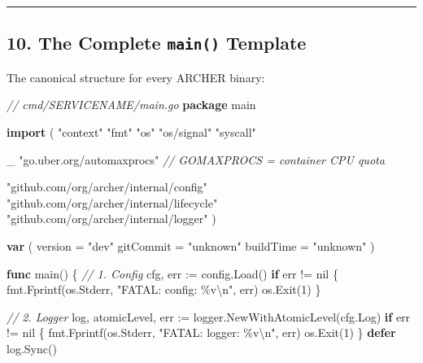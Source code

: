 \documentclass[
]{article}
\newenvironment{Shaded}{}{}
\newcommand{\CharTok}[1]{\textcolor[rgb]{0.25,0.44,0.63}{#1}}
\newcommand{\CommentTok}[1]{\textcolor[rgb]{0.38,0.63,0.69}{\textit{#1}}}
\newcommand{\ControlFlowTok}[1]{\textcolor[rgb]{0.00,0.44,0.13}{\textbf{#1}}}
\newcommand{\DecValTok}[1]{\textcolor[rgb]{0.25,0.63,0.44}{#1}}
\newcommand{\KeywordTok}[1]{\textcolor[rgb]{0.00,0.44,0.13}{\textbf{#1}}}
\newcommand{\NormalTok}[1]{#1}
\newcommand{\OperatorTok}[1]{\textcolor[rgb]{0.40,0.40,0.40}{#1}}
\newcommand{\OtherTok}[1]{\textcolor[rgb]{0.00,0.44,0.13}{#1}}
\newcommand{\StringTok}[1]{\textcolor[rgb]{0.25,0.44,0.63}{#1}}
\begin{document}
\begin{center}\rule{0.5\linewidth}{0.5pt}\end{center}

\hypertarget{the-complete-main-template}{%
\subsection{\texorpdfstring{10. The Complete \texttt{main()}
Template}{10. The Complete main() Template}}\label{the-complete-main-template}}

The canonical structure for every ARCHER binary:

\begin{Shaded}
\begin{Highlighting}[]
\CommentTok{// cmd/SERVICENAME/main.go}
\KeywordTok{package}\NormalTok{ main}

\KeywordTok{import} \OperatorTok{(}
    \StringTok{"context"}
    \StringTok{"fmt"}
    \StringTok{"os"}
    \StringTok{"os/signal"}
    \StringTok{"syscall"}

\NormalTok{    \_ }\StringTok{"go.uber.org/automaxprocs"} \CommentTok{// GOMAXPROCS = container CPU quota}

    \StringTok{"github.com/org/archer/internal/config"}
    \StringTok{"github.com/org/archer/internal/lifecycle"}
    \StringTok{"github.com/org/archer/internal/logger"}
\OperatorTok{)}

\KeywordTok{var} \OperatorTok{(}
\NormalTok{    version   }\OperatorTok{=} \StringTok{"dev"}
\NormalTok{    gitCommit }\OperatorTok{=} \StringTok{"unknown"}
\NormalTok{    buildTime }\OperatorTok{=} \StringTok{"unknown"}
\OperatorTok{)}

\KeywordTok{func}\NormalTok{ main}\OperatorTok{()} \OperatorTok{\{}
    \CommentTok{// 1. Config}
\NormalTok{    cfg}\OperatorTok{,}\NormalTok{ err }\OperatorTok{:=}\NormalTok{ config}\OperatorTok{.}\NormalTok{Load}\OperatorTok{()}
    \ControlFlowTok{if}\NormalTok{ err }\OperatorTok{!=} \OtherTok{nil} \OperatorTok{\{}
\NormalTok{        fmt}\OperatorTok{.}\NormalTok{Fprintf}\OperatorTok{(}\NormalTok{os}\OperatorTok{.}\NormalTok{Stderr}\OperatorTok{,} \StringTok{"FATAL: config: \%v}\CharTok{\textbackslash{}n}\StringTok{"}\OperatorTok{,}\NormalTok{ err}\OperatorTok{)}
\NormalTok{        os}\OperatorTok{.}\NormalTok{Exit}\OperatorTok{(}\DecValTok{1}\OperatorTok{)}
    \OperatorTok{\}}

    \CommentTok{// 2. Logger}
\NormalTok{    log}\OperatorTok{,}\NormalTok{ atomicLevel}\OperatorTok{,}\NormalTok{ err }\OperatorTok{:=}\NormalTok{ logger}\OperatorTok{.}\NormalTok{NewWithAtomicLevel}\OperatorTok{(}\NormalTok{cfg}\OperatorTok{.}\NormalTok{Log}\OperatorTok{)}
    \ControlFlowTok{if}\NormalTok{ err }\OperatorTok{!=} \OtherTok{nil} \OperatorTok{\{}
\NormalTok{        fmt}\OperatorTok{.}\NormalTok{Fprintf}\OperatorTok{(}\NormalTok{os}\OperatorTok{.}\NormalTok{Stderr}\OperatorTok{,} \StringTok{"FATAL: logger: \%v}\CharTok{\textbackslash{}n}\StringTok{"}\OperatorTok{,}\NormalTok{ err}\OperatorTok{)}
\NormalTok{        os}\OperatorTok{.}\NormalTok{Exit}\OperatorTok{(}\DecValTok{1}\OperatorTok{)}
    \OperatorTok{\}}
    \ControlFlowTok{defer}\NormalTok{ log}\OperatorTok{.}\NormalTok{Sync}\OperatorTok{()}


\end{Highlighting}
\end{Shaded}
\end{document}
